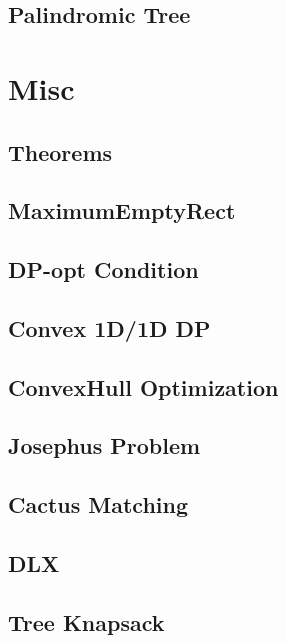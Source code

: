 \documentclass[a4paper,10pt,twocolumn,oneside]{article}
\begin{document}
\subsection{Palindromic Tree}


\section{Misc}
\subsection{Theorems}

\subsection{MaximumEmptyRect}

\subsection{DP-opt Condition}

\subsection{Convex 1D/1D DP}

\subsection{ConvexHull Optimization}

\subsection{Josephus Problem}

\subsection{Cactus Matching}

\subsection{DLX}

\subsection{Tree Knapsack}

\end{document}

